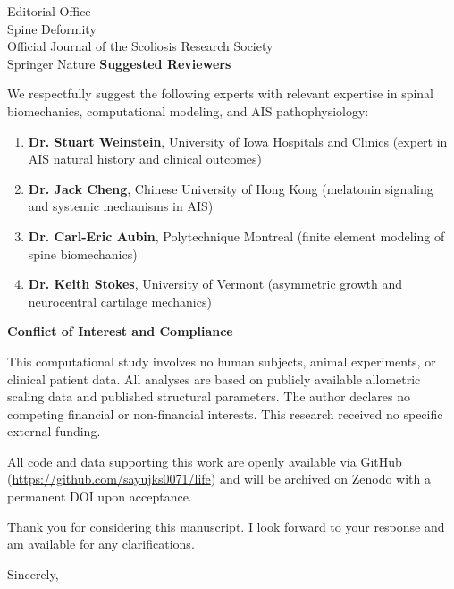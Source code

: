 \documentclass[11pt,a4paper]{letter}
\begin{document}
\begin{letter}{Editorial Office\\
Spine Deformity\\
Official Journal of the Scoliosis Research Society\\
Springer Nature}
\textbf{Suggested Reviewers}

We respectfully suggest the following experts with relevant expertise in spinal biomechanics, computational modeling, and AIS pathophysiology:

\begin{enumerate}
\item \textbf{Dr. Stuart Weinstein}, University of Iowa Hospitals and Clinics (expert in AIS natural history and clinical outcomes)
\item \textbf{Dr. Jack Cheng}, Chinese University of Hong Kong (melatonin signaling and systemic mechanisms in AIS)
\item \textbf{Dr. Carl-Eric Aubin}, Polytechnique Montreal (finite element modeling of spine biomechanics)
\item \textbf{Dr. Keith Stokes}, University of Vermont (asymmetric growth and neurocentral cartilage mechanics)
\end{enumerate}

\textbf{Conflict of Interest and Compliance}

This computational study involves no human subjects, animal experiments, or clinical patient data. All analyses are based on publicly available allometric scaling data and published structural parameters. The author declares no competing financial or non-financial interests. This research received no specific external funding.

All code and data supporting this work are openly available via GitHub (\url{https://github.com/sayujks0071/life}) and will be archived on Zenodo with a permanent DOI upon acceptance.

Thank you for considering this manuscript. I look forward to your response and am available for any clarifications.

\closing{Sincerely,}

\end{letter}
\end{document}

